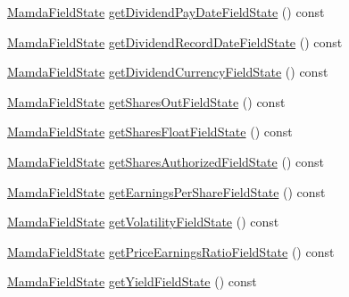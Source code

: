 \begin{CompactItemize}
\item 
\hyperlink{namespaceWombat_93aac974f2ab713554fd12a1fa3b7d2a}{Mamda\-Field\-State} \hyperlink{classWombat_1_1MamdaFundamentalListener_5eecefe805188a8575e9fa0239145708}{get\-Dividend\-Pay\-Date\-Field\-State} () const 
\item 
\hyperlink{namespaceWombat_93aac974f2ab713554fd12a1fa3b7d2a}{Mamda\-Field\-State} \hyperlink{classWombat_1_1MamdaFundamentalListener_baaedf6fb1b2eae95df6617d0b893224}{get\-Dividend\-Record\-Date\-Field\-State} () const 
\item 
\hyperlink{namespaceWombat_93aac974f2ab713554fd12a1fa3b7d2a}{Mamda\-Field\-State} \hyperlink{classWombat_1_1MamdaFundamentalListener_e30b3e82e42b4477de977764592731ee}{get\-Dividend\-Currency\-Field\-State} () const 
\item 
\hyperlink{namespaceWombat_93aac974f2ab713554fd12a1fa3b7d2a}{Mamda\-Field\-State} \hyperlink{classWombat_1_1MamdaFundamentalListener_0115bc828235b93375c1c3a53d8bada9}{get\-Shares\-Out\-Field\-State} () const 
\item 
\hyperlink{namespaceWombat_93aac974f2ab713554fd12a1fa3b7d2a}{Mamda\-Field\-State} \hyperlink{classWombat_1_1MamdaFundamentalListener_936931460f7e4cb720e366b5a4eab60f}{get\-Shares\-Float\-Field\-State} () const 
\item 
\hyperlink{namespaceWombat_93aac974f2ab713554fd12a1fa3b7d2a}{Mamda\-Field\-State} \hyperlink{classWombat_1_1MamdaFundamentalListener_4c92c5309a8a142cc95541447c4c1403}{get\-Shares\-Authorized\-Field\-State} () const 
\item 
\hyperlink{namespaceWombat_93aac974f2ab713554fd12a1fa3b7d2a}{Mamda\-Field\-State} \hyperlink{classWombat_1_1MamdaFundamentalListener_fa468a5bdef49cfbd10ce80223058091}{get\-Earnings\-Per\-Share\-Field\-State} () const 
\item 
\hyperlink{namespaceWombat_93aac974f2ab713554fd12a1fa3b7d2a}{Mamda\-Field\-State} \hyperlink{classWombat_1_1MamdaFundamentalListener_941388a4d6f212cec924cebf8d49933a}{get\-Volatility\-Field\-State} () const 
\item 
\hyperlink{namespaceWombat_93aac974f2ab713554fd12a1fa3b7d2a}{Mamda\-Field\-State} \hyperlink{classWombat_1_1MamdaFundamentalListener_39858ced30ea763c49091af7ef682d73}{get\-Price\-Earnings\-Ratio\-Field\-State} () const 
\item 
\hyperlink{namespaceWombat_93aac974f2ab713554fd12a1fa3b7d2a}{Mamda\-Field\-State} \hyperlink{classWombat_1_1MamdaFundamentalListener_e2ef62938cccc0dfd0248b42f8666314}{get\-Yield\-Field\-State} () const 

\end{CompactItemize}
